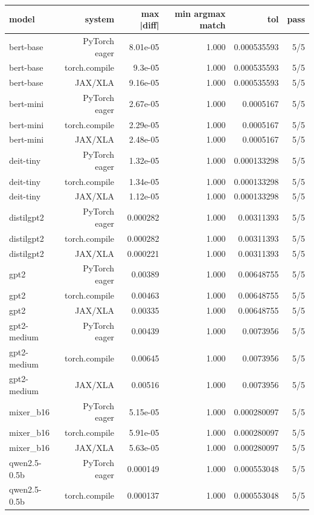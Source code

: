 \begin{tabular}{lrrrrr}
\toprule
model & system & max |diff| & min argmax match & tol & pass \\
\midrule
bert-base & PyTorch eager & 8.01e-05 & 1.000 & 0.000535593 & 5/5 \\
bert-base & torch.compile & 9.3e-05 & 1.000 & 0.000535593 & 5/5 \\
bert-base & JAX/XLA & 9.16e-05 & 1.000 & 0.000535593 & 5/5 \\
bert-mini & PyTorch eager & 2.67e-05 & 1.000 & 0.0005167 & 5/5 \\
bert-mini & torch.compile & 2.29e-05 & 1.000 & 0.0005167 & 5/5 \\
bert-mini & JAX/XLA & 2.48e-05 & 1.000 & 0.0005167 & 5/5 \\
deit-tiny & PyTorch eager & 1.32e-05 & 1.000 & 0.000133298 & 5/5 \\
deit-tiny & torch.compile & 1.34e-05 & 1.000 & 0.000133298 & 5/5 \\
deit-tiny & JAX/XLA & 1.12e-05 & 1.000 & 0.000133298 & 5/5 \\
distilgpt2 & PyTorch eager & 0.000282 & 1.000 & 0.00311393 & 5/5 \\
distilgpt2 & torch.compile & 0.000282 & 1.000 & 0.00311393 & 5/5 \\
distilgpt2 & JAX/XLA & 0.000221 & 1.000 & 0.00311393 & 5/5 \\
gpt2 & PyTorch eager & 0.00389 & 1.000 & 0.00648755 & 5/5 \\
gpt2 & torch.compile & 0.00463 & 1.000 & 0.00648755 & 5/5 \\
gpt2 & JAX/XLA & 0.00335 & 1.000 & 0.00648755 & 5/5 \\
gpt2-medium & PyTorch eager & 0.00439 & 1.000 & 0.0073956 & 5/5 \\
gpt2-medium & torch.compile & 0.00645 & 1.000 & 0.0073956 & 5/5 \\
gpt2-medium & JAX/XLA & 0.00516 & 1.000 & 0.0073956 & 5/5 \\
mixer\_b16 & PyTorch eager & 5.15e-05 & 1.000 & 0.000280097 & 5/5 \\
mixer\_b16 & torch.compile & 5.91e-05 & 1.000 & 0.000280097 & 5/5 \\
mixer\_b16 & JAX/XLA & 5.63e-05 & 1.000 & 0.000280097 & 5/5 \\
qwen2.5-0.5b & PyTorch eager & 0.000149 & 1.000 & 0.000553048 & 5/5 \\
qwen2.5-0.5b & torch.compile & 0.000137 & 1.000 & 0.000553048 & 5/5 \\

\end{tabular}
